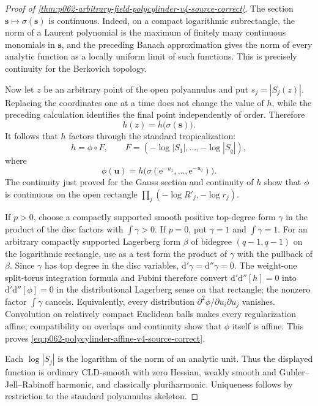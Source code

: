 \begin{proof}[Proof of \cref{thm:p062-arbitrary-field-polycylinder-v4-source-correct}]
The section \(\mathbf s\mapsto\sigma(\mathbf s)\) is continuous. Indeed,
on a compact logarithmic subrectangle, the norm of a Laurent polynomial is
the maximum of finitely many continuous monomials in \(\mathbf s\), and
the preceding Banach approximation gives the norm of every analytic
function as a locally uniform limit of such functions. This is precisely
continuity for the Berkovich topology.

Now let \(z\) be an arbitrary point of the open polyannulus and put
\(s_j=|S_j(z)|\). Replacing the coordinates one at a time does not change
the value of \(h\), while the preceding calculation identifies the final
point independently of order. Therefore
\[
                     h(z)=h\bigl(\sigma(\mathbf s)\bigr).
\]
It follows that \(h\) factors through the standard tropicalization:
\begin{equation}\label{eq:p062-polycylinder-factor-v4-source-correct}
 h=\phi\circ F,
 \qquad
 F=(-\log|S_1|,\ldots,-\log|S_q|),
\end{equation}
where
\[
             \phi(\mathbf u)
                =h\bigl(\sigma(\mathrm e^{-u_1},\ldots,
                                      \mathrm e^{-u_q})\bigr).
\]
The continuity just proved for the Gauss section and continuity of \(h\)
show that \(\phi\) is continuous on the open rectangle
\(
 \prod_j(-\log R'_j,-\log r_j).
\)

If \(p>0\), choose a compactly supported smooth positive top-degree form
\(\gamma\) in the product of the disc factors with
\(\int\gamma>0\). If \(p=0\), put \(\gamma=1\) and
\(\int\gamma=1\). For an arbitrary compactly supported Lagerberg form
\(\beta\) of bidegree \((q-1,q-1)\) on the logarithmic rectangle, use as
a test form the product of \(\gamma\) with the pullback of \(\beta\).
Since \(\gamma\) has top degree in the disc variables,
\(\mathrm d'\gamma=\mathrm d''\gamma=0\). The weight-one split-torus
integration formula and Fubini therefore convert
\(
 \mathrm d'\mathrm d''[h]=0
\)
into
\(
 \mathrm d'\mathrm d''[\phi]=0
\)
in the distributional Lagerberg sense on that rectangle; the nonzero
factor \(\int\gamma\) cancels. Equivalently,
every distribution
\(
 \partial^2\phi/\partial u_i\partial u_j
\)
vanishes. Convolution on relatively compact Euclidean balls makes every
regularization affine; compatibility on overlaps and continuity show that
\(\phi\) itself is affine. This proves
\eqref{eq:p062-polycylinder-affine-v4-source-correct}.

Each \(\log|S_j|\) is the logarithm of the norm of an analytic unit.
Thus the displayed function is ordinary CLD-smooth with zero Hessian,
weakly smooth and Gubler--Jell--Rabinoff harmonic, and classically
pluriharmonic. Uniqueness follows by restriction to the standard
polyannulus skeleton.
\end{proof}
